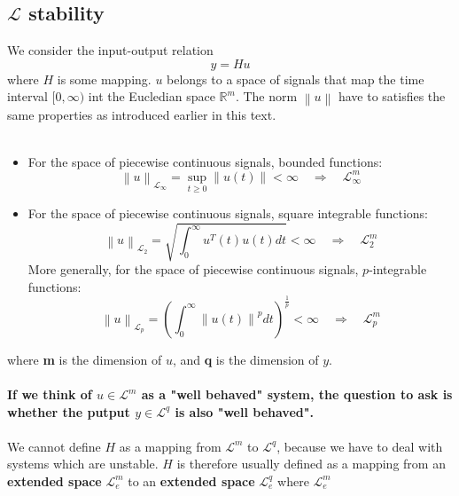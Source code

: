 \documentclass{article}
\begin{document}
\subsection{$\mathcal{L}$ stability}
We consider the input-output relation
\begin{equation}
	y = H u
	\label{eqn: i-o-relation}
\end{equation}
where $H$ is some mapping. $u$ belongs to a space of signals that map the time interval $[0, \infty )$ int the Eucledian space $\mathbb{R}^m$. The norm $\left\| u \right\| $ have to satisfies the same properties as introduced earlier in this text.
\\\\
\begin{itemize}
	\item For the space of piecewise continuous signals, bounded functions:
	\begin{equation}
		\left\| u \right\| _{\mathcal{L}_\infty } = \sup_{t \geq 0} \left\| u(t) \right\| < \infty \quad \Rightarrow  \quad \mathcal{L}^m_\infty
	\end{equation}
	\item For the space of piecewise continuous signals, square integrable functions:
	\begin{equation}
		\left\| u \right\|_{\mathcal{L}_2} = \sqrt{\int_{0}^{\infty} u^T(t) u(t) dt} < \infty \quad \Rightarrow  \quad \mathcal{L}^m_2
	\end{equation}
	More generally, for the space of piecewise continuous signals, $p$-integrable functions:
	\begin{equation}
		\left\| u \right\|_{\mathcal{L}_p} = \left( \int_{0}^{\infty} \left\| u(t) \right\|^p dt \right)^{\frac{1}{p}} < \infty \quad \Rightarrow  \quad \mathcal{L}^m_p
	\end{equation}
\end{itemize}
where \textbf{m} is the dimension of $u$, and \textbf{q} is the dimension of $y$. 
\\\\
\textbf{If we think of $u \in  \mathcal{L}^m$ as a "well behaved" system, the question to ask is whether the putput $y \in \mathcal{L}^q$ is also "well behaved".}
\\\\
We cannot define $H$ as a mapping from $\mathcal{L}^m$ to $\mathcal{L}^q$, because we have to deal with systems which are unstable. $H$ is therefore usually defined as a mapping from an \textbf{extended space} $\mathcal{L}_e^m$ to an \textbf{extended space} $\mathcal{L}_e^q$ where $\mathcal{L}_e^m$
\end{document}
